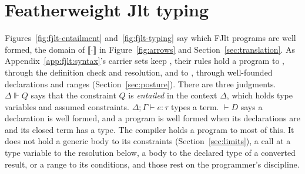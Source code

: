 \section{Featherweight Jlt typing}
\label{app:fjlt:typing}

Figures~\ref{fig:fjlt-entailment} and~\ref{fig:fjlt-typing} say which FJlt programs are well formed, the domain of $\llbracket\cdot\rrbracket$ in Figure~\ref{fig:arrows} and Section~\ref{sec:translation}.
As Appendix~\ref{app:fjlt:syntax}'s carrier sets keep \RuleOne{}, their rules hold a program to \RuleTwo{}, through the definition check and resolution, and to \RuleThree{}, through well-founded declarations and ranges (Section~\ref{sec:posture}).
There are three judgments.
$\Delta \Vdash Q$ says that the constraint $Q$ is \emph{entailed} in the context $\Delta$, which holds type variables and assumed constraints.
$\Delta; \Gamma \vdash e : \tau$ types a term.
$\vdash D$ says a declaration is well formed, and a program is well formed when its declarations are and its closed term has a type.
The compiler holds a program to most of this.
It does not hold a generic body to its constraints (Section~\ref{sec:limits}), a call at a type variable to the resolution below, a body to the declared type of a converted result, or a range to its conditions, and those rest on the programmer's discipline.

